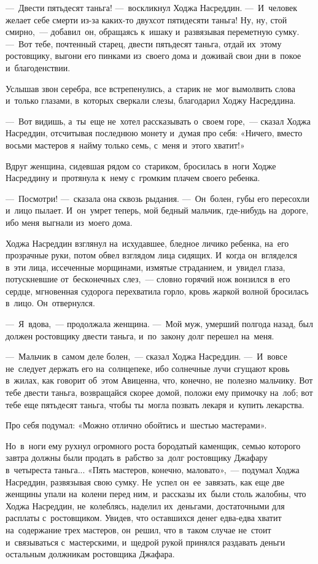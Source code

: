 \documentclass[12pt,a4paper]{book}
\begin{document}
—~Двести пятьдесят таньга! —~воскликнул Ходжа Насреддин. —~И~человек желает себе смерти из-за каких-то двухсот пятидесяти таньга! Ну, ну, стой смирно,~— добавил~он, обращаясь к~ишаку и~развязывая переметную сумку. —~Вот тебе, почтенный старец, двести пятьдесят таньга, отдай их~этому ростовщику, выгони его пинками из~своего дома и~доживай свои дни в~покое и~благоденствии.

Услышав звон серебра, все встрепенулись, а~старик не~мог вымолвить слова и~только глазами, в~которых сверкали слезы, благодарил Ходжу Насреддина.

—~Вот видишь, а~ты~еще не~хотел рассказывать о~своем горе,~— сказал Ходжа Насреддин, отсчитывая последнюю монету и~думая про себя: «Ничего, вместо восьми мастеров я~найму только семь, с~меня и~этого хватит!»

Вдруг женщина, сидевшая рядом со~стариком, бросилась в~ноги Ходже Насреддину и~протянула к~нему с~громким плачем своего ребенка.

—~Посмотри! —~сказала она сквозь рыдания. —~Он~болен, губы его пересохли и~лицо пылает. И~он~умрет теперь, мой бедный мальчик, где-нибудь на~дороге, ибо меня выгнали из~моего дома.

Ходжа Насреддин взглянул на~исхудавшее, бледное личико ребенка, на~его прозрачные руки, потом обвел взглядом лица сидящих. И~когда он~вгляделся в~эти лица, иссеченные морщинами, измятые страданием, и~увидел глаза, потускневшие от~бесконечных слез,~— словно горячий нож вонзился в~его сердце, мгновенная судорога перехватила горло, кровь жаркой волной бросилась в~лицо. Он~отвернулся.

—~Я~вдова,~— продолжала женщина. —~Мой муж, умерший полгода назад, был должен ростовщику двести таньга, и~по~закону долг перешел на~меня.

—~Мальчик в~самом деле болен,~— сказал Ходжа Насреддин. —~И~вовсе не~следует держать его на~солнцепеке, ибо солнечные лучи сгущают кровь в~жилах, как говорит об~этом Авиценна, что, конечно, не~полезно мальчику. Вот тебе двести таньга, возвращайся скорее домой, положи ему примочку на~лоб; вот тебе еще пятьдесят таньга, чтобы ты~могла позвать лекаря и~купить лекарства.

Про себя подумал: «Можно отлично обойтись и~шестью мастерами».

Но~в~ноги ему рухнул огромного роста бородатый каменщик, семью которого завтра должны были продать в~рабство за~долг ростовщику Джафару в~четыреста таньга... «Пять мастеров, конечно, маловато»,~— подумал Ходжа Насреддин, развязывая свою сумку. Не~успел он~ее~завязать, как еще две женщины упали на~колени перед ним, и~рассказы их~были столь жалобны, что Ходжа Насреддин, не~колеблясь, наделил их~деньгами, достаточными для расплаты с~ростовщиком. Увидев, что оставшихся денег едва-едва хватит на~содержание трех мастеров, он~решил, что в~таком случае не~стоит и~связываться с~мастерскими, и~щедрой рукой принялся раздавать деньги остальным должникам ростовщика Джафара.
\end{document}
